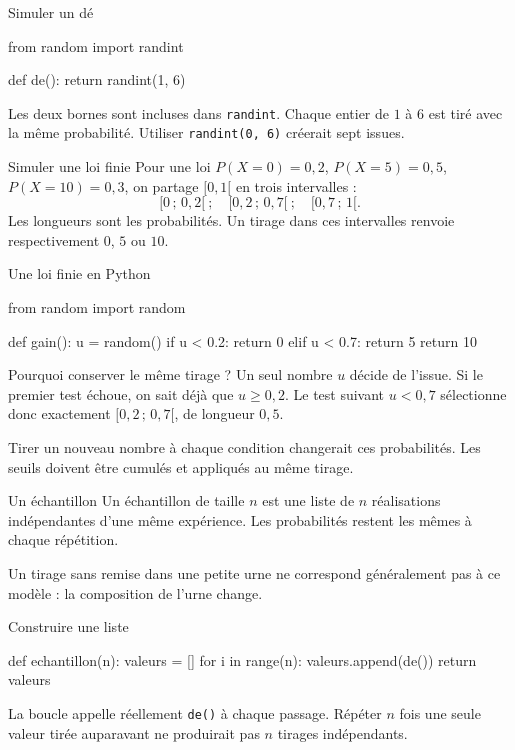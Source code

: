 \documentclass[aspectratio=169,12pt]{beamer}
\begin{document}
\renewcommand{\slidekind}{COMPRENDRE}
\begin{frame}[t,fragile]{Simuler un dé}
\begin{codepython}
from random import randint

def de():
    return randint(1, 6)
\end{codepython}
Les deux bornes sont incluses dans \texttt{randint}. Chaque entier de $1$ à $6$ est tiré avec la même probabilité. Utiliser \texttt{randint(0, 6)} créerait sept issues.
\end{frame}
\renewcommand{\slidekind}{COMPRENDRE}
\begin{frame}[t,fragile]{Simuler une loi finie}
Pour une loi $P(X=0)=0,2$, $P(X=5)=0,5$, $P(X=10)=0,3$, on partage $[0,1[$ en trois intervalles :\[ [0\,;\,0,2[\ ;\quad[0,2\,;\,0,7[\ ;\quad[0,7\,;\,1[.\] Les longueurs sont les probabilités. Un tirage dans ces intervalles renvoie respectivement $0$, $5$ ou $10$.
\end{frame}
\renewcommand{\slidekind}{COMPRENDRE}
\begin{frame}[t,fragile]{Une loi finie en Python}
\begin{codepython}
from random import random

def gain():
    u = random()
    if u < 0.2:
        return 0
    elif u < 0.7:
        return 5
    return 10
\end{codepython}
\end{frame}
\renewcommand{\slidekind}{JUSTIFIER}
\begin{frame}[t,fragile]{Pourquoi conserver le même tirage ?}
Un seul nombre $u$ décide de l’issue. Si le premier test échoue, on sait déjà que $u\ge0,2$. Le test suivant $u<0,7$ sélectionne donc exactement $[0,2\,;\,0,7[$, de longueur $0,5$.\medskip\par Tirer un nouveau nombre à chaque condition changerait ces probabilités. Les seuils doivent être cumulés et appliqués au même tirage.
\end{frame}
\renewcommand{\slidekind}{COMPRENDRE}
\begin{frame}[t,fragile]{Un échantillon}
Un échantillon de taille $n$ est une liste de $n$ réalisations indépendantes d’une même expérience. Les probabilités restent les mêmes à chaque répétition.\medskip\par Un tirage sans remise dans une petite urne ne correspond généralement pas à ce modèle : la composition de l’urne change.
\end{frame}
\renewcommand{\slidekind}{COMPRENDRE}
\begin{frame}[t,fragile]{Construire une liste}
\begin{codepython}
def echantillon(n):
    valeurs = []
    for i in range(n):
        valeurs.append(de())
    return valeurs
\end{codepython}
La boucle appelle réellement \texttt{de()} à chaque passage. Répéter $n$ fois une seule valeur tirée auparavant ne produirait pas $n$ tirages indépendants.
\end{frame}
\end{document}
